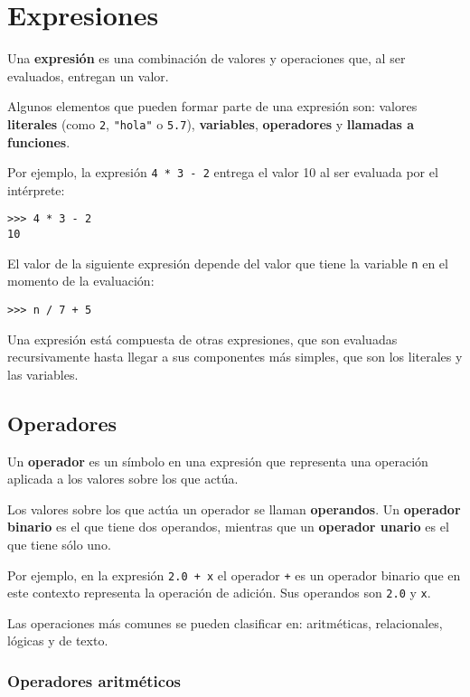 \section{Expresiones}

Una \textbf{expresión} es una combinación de valores y operaciones que,
al ser evaluados, entregan un valor.

Algunos elementos que pueden formar parte de una expresión son: valores
\textbf{literales} (como \lstinline!2!, \lstinline!"hola"! o
\lstinline!5.7!), \textbf{variables}, \textbf{operadores} y
\textbf{llamadas a funciones}.

Por ejemplo, la expresión \lstinline!4 * 3 - 2! entrega el valor 10 al
ser evaluada por el intérprete:

\begin{lstlisting}
>>> 4 * 3 - 2
10
\end{lstlisting}

El valor de la siguiente expresión depende del valor que tiene la
variable \lstinline!n! en el momento de la evaluación:

\begin{lstlisting}
>>> n / 7 + 5
\end{lstlisting}

Una expresión está compuesta de otras expresiones, que son evaluadas
recursivamente hasta llegar a sus componentes más simples, que son los
literales y las variables.

\subsection{Operadores}

Un \textbf{operador} es un símbolo en una expresión que representa una
operación aplicada a los valores sobre los que actúa.

Los valores sobre los que actúa un operador se llaman
\textbf{operandos}. Un \textbf{operador binario} es el que tiene dos
operandos, mientras que un \textbf{operador unario} es el que tiene sólo
uno.

Por ejemplo, en la expresión \lstinline!2.0 + x! el operador
\lstinline!+! es un operador binario que en este contexto representa la
operación de adición. Sus operandos son \lstinline!2.0! y \lstinline!x!.

Las operaciones más comunes se pueden clasificar en: aritméticas,
relacionales, lógicas y de texto.

\subsubsection{Operadores aritméticos}

